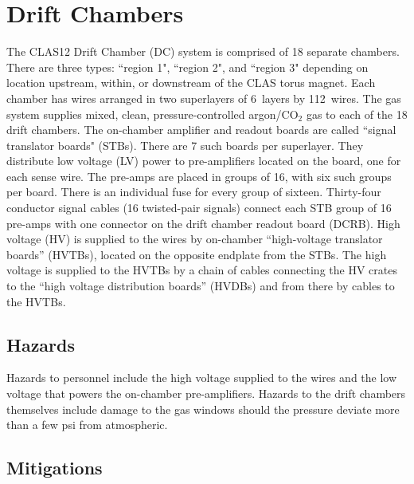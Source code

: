 \section{Drift Chambers}

The CLAS12 Drift Chamber (DC) system is comprised of 18 separate chambers. There are 
three types: ``region 1", ``region 2", and ``region 3" depending on location upstream, 
within, or downstream of the CLAS torus magnet. Each chamber has wires arranged in two 
superlayers of 6~layers by 112~wires. The gas system supplies mixed, clean, 
pressure-controlled argon/CO$_2$ gas to each of the 18 drift chambers. The on-chamber 
amplifier and readout boards are called ``signal translator boards" (STBs). There are 7 such 
boards per superlayer. They distribute low voltage (LV) power to pre-amplifiers located on the 
board, one for each sense wire. The pre-amps are placed in groups of 16, with six such groups 
per board. There is an individual fuse for every group of sixteen. Thirty-four conductor signal 
cables (16 twisted-pair signals) connect each STB group of 16 pre-amps with one connector on 
the drift chamber readout board (DCRB). High voltage (HV) is supplied to the wires by on-chamber 
``high-voltage translator boards'' (HVTBs), located on the opposite endplate from the STBs. The 
high voltage is supplied to the HVTBs by a chain of cables connecting the HV crates to the 
``high voltage distribution boards'' (HVDBs) and from there by cables to the HVTBs.

\subsection{Hazards} 

Hazards to personnel include the high voltage supplied to the wires and the low voltage that 
powers the on-chamber pre-amplifiers. Hazards to the drift chambers themselves include damage 
to the gas windows should the pressure deviate more than a few psi from atmospheric. 

\subsection{Mitigations}

